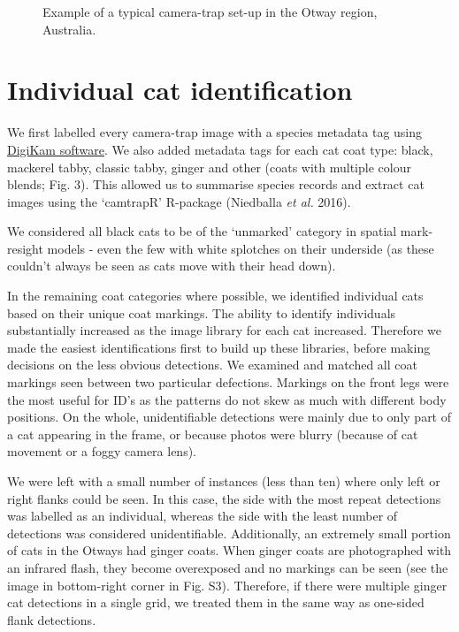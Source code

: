 \documentclass[11pt,a4paper,titlepage,twoside,openright]{style/unimelbthesis}
\begin{document}
\begin{mainmatter}
\begin{figure}
{}

\caption{Example of a typical camera-trap set-up in the Otway region, Australia.}\label{fig:density-cam-photo}
\end{figure}
\newpage

\hypertarget{density-app-id}{%
\section{Individual cat identification}\label{density-app-id}}

We first labelled every camera-trap image with a species metadata tag using \href{https://www.digikam.org}{DigiKam software}. We also added metadata tags for each cat coat type: black, mackerel tabby, classic tabby, ginger and other (coats with multiple colour blends; Fig. 3). This allowed us to summarise species records and extract cat images using the `camtrapR' R-package (Niedballa \emph{et al.} 2016).

We considered all black cats to be of the `unmarked' category in spatial mark-resight models - even the few with white splotches on their underside (as these couldn't always be seen as cats move with their head down).

In the remaining coat categories where possible, we identified individual cats based on their unique coat markings. The ability to identify individuals substantially increased as the image library for each cat increased. Therefore we made the easiest identifications first to build up these libraries, before making decisions on the less obvious detections. We examined and matched all coat markings seen between two particular defections. Markings on the front legs were the most useful for ID's as the patterns do not skew as much with different body positions. On the whole, unidentifiable detections were mainly due to only part of a cat appearing in the frame, or because photos were blurry (because of cat movement or a foggy camera lens).

We were left with a small number of instances (less than ten) where only left or right flanks could be seen. In this case, the side with the most repeat detections was labelled as an individual, whereas the side with the least number of detections was considered unidentifiable. Additionally, an extremely small portion of cats in the Otways had ginger coats. When ginger coats are photographed with an infrared flash, they become overexposed and no markings can be seen (see the image in bottom-right corner in Fig. S3). Therefore, if there were multiple ginger cat detections in a single grid, we treated them in the same way as one-sided flank detections.


\end{mainmatter}
\end{document}
